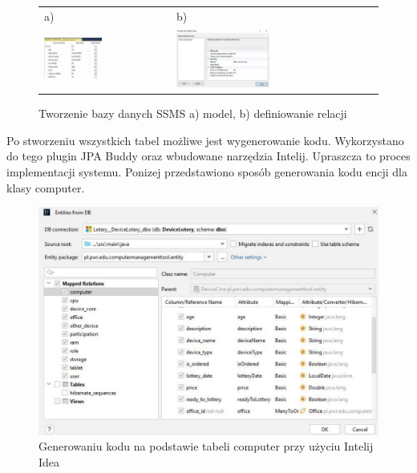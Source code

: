\begin{figure}[htb]
  \centering
	\begin{tabular}{@{}ll@{}}
	a) & b) \\
  \includegraphics[width=0.475\textwidth]{rys04/design.pdf} & 
	\includegraphics[width=0.475\textwidth]{rys04/relation.pdf}
	\end{tabular}
  \caption{Tworzenie bazy danych SSMS a) model, b) definiowanie relacji}
  \label{ssms_tworzenie:label}
\end{figure}

Po stworzeniu wszystkich tabel możliwe jest wygenerowanie kodu. Wykorzystano do tego plugin JPA Buddy oraz wbudowane narzędzia Intelij. Upraszcza to proces implementacji systemu. Ponizej przedstawiono sposób generowania kodu encji dla klasy computer.

\begin{figure}[h]
		\centering
    \includegraphics[width=0.7\linewidth]{rys04/generate.pdf}
    \caption{Generowaniu kodu na podstawie tabeli computer przy użyciu Intelij Idea}
    \label{generate:label}
\end{figure}

